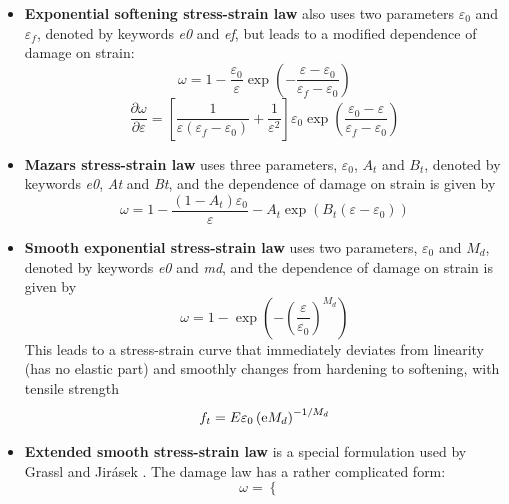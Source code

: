 \documentclass[a4paper]{article}
\begin{document}
\begin{itemize}
{\bf Linear softening stress-strain law} works directly with strain
and does not make any adjustment for the element size. The specified
parameters $\varepsilon_0$ and $\varepsilon_f$, denoted by keywords {\it e0}
and {\it ef}, have the meaning of (equivalent) strain at peak stress and at
complete failure. The linear relation between stress and strain on the
softening branch is obtained with the damage law
$$
\omega =\frac{\varepsilon_f}{\varepsilon_f-\varepsilon_0}\left(1-\frac{\varepsilon_0}{\varepsilon}\right)
$$
Again, to cover general conditions, $\varepsilon$ is replaced by $\kappa$.
$$
\frac{\partial\omega}{\partial\varepsilon} = \frac{\varepsilon_0 \varepsilon_f}{\varepsilon^2 ( \varepsilon_f - \varepsilon_0 )}
$$
\item
{\bf Exponential softening stress-strain law} also uses two parameters
 $\varepsilon_0$ and $\varepsilon_f$, denoted by keywords {\it e0}
and {\it ef}, but leads to a modified dependence of damage on strain:
$$
\omega =1-\frac{\varepsilon_0}{\varepsilon}\exp\left(-\frac{\varepsilon-\varepsilon_0}{\varepsilon_f-\varepsilon_0}\right)
$$
$$
\frac{\partial\omega}{\partial\varepsilon} = \left[ \frac{1}{\varepsilon(\varepsilon_f-\varepsilon_0)} + \frac{1}{\varepsilon^2} \right] \varepsilon_0 \exp \left (\frac{\varepsilon_0-\varepsilon}{\varepsilon_f-\varepsilon_0} \right )
$$
\item
{\bf Mazars stress-strain law} uses three parameters, $\varepsilon_0$,
$A_t$ and $B_t$, denoted by keywords {\it e0}, {\it At} and {\it Bt}, and the
dependence of damage on strain is given by
$$
\omega =1-\frac{(1-A_t)\varepsilon_0}{\varepsilon}-A_t\exp\left(B_t(\varepsilon-\varepsilon_0)\right)
$$
\item
{\bf Smooth exponential stress-strain law} uses two parameters, $\varepsilon_0$
and $M_d$, denoted by keywords {\it e0} and {\it md}, and the
dependence of damage on strain is given by
$$
\omega = 1-\exp\left(-\left(\frac{\varepsilon}{\varepsilon_0}\right)^{M_d}\right)
$$
This leads to a stress-strain curve that immediately deviates from linearity
(has no elastic part) and smoothly changes from hardening to softening,
with tensile strength
$$
f_t = E\varepsilon_0\left({\rm e}M_d\right)^{-1/M_d}
$$
\item
{\bf Extended smooth stress-strain law} is a special formulation used
by Grassl and Jir\'{a}sek \cite{GraJir10}. The damage law has a rather complicated form:
\begin{equation} \label{eq:damageEvol}
\omega = \left\{ \begin{array}{ll} 

\end{array}
\end{equation}
\end{itemize}
\end{document}
